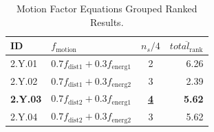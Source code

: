 \begin{table}[ht]
\centering
\footnotesize
\caption{Motion Factor Equations Grouped Ranked Results.}
\label{tab:motion_equations_grouped_ranked}
\begin{tabular}{@{}llcr@{}}
\hline
    ID & $f_{\text{motion}}$ & $n_s/4$ & $\overline{total_{\text{rank}}}$ \\
\hline
    2.Y.01 & $0.7f_{\text{dist1}} + 0.3f_{\text{energ1}}$ & 2 & 6.26 \\
    2.Y.02 & $0.7f_{\text{dist1}} + 0.3f_{\text{energ2}}$ & 3 & 2.39 \\
    \textbf{2.Y.03} & \textbf{$0.7f_{\text{dist2}} + 0.3f_{\text{energ1}}$} & \textbf{\underline{4}} & \textbf{5.62} \\
    2.Y.04 & $0.7f_{\text{dist2}} + 0.3f_{\text{energ2}}$ & 3 & 5.62 \\
\hline
\end{tabular}
\end{table}